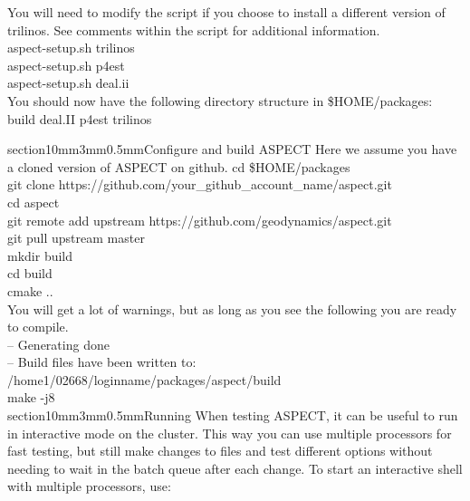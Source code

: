 \documentclass[11pt]{article}
\makeatletter
\renewcommand{\section}{\@startsection
  {section}{1}{0mm}{3mm}{0.5mm}{\bfseries\large}}
\makeatother
\begin{document}
You will need to modify the script if you choose to install a different version of trilinos.  See comments within the script for additional information.\\
 
 aspect-setup.sh trilinos \\
 aspect-setup.sh p4est \\
 aspect-setup.sh deal.ii    \\
 
 You should now have the following directory structure in \$HOME/packages: \\
  
  build  deal.II  p4est  trilinos

 \section{Configure and build ASPECT}
 Here we assume you have a cloned version of ASPECT on github.  
 cd \$HOME/packages \\
 git clone https://github.com/your\_github\_account\_name/aspect.git \\
 cd aspect \\
 git remote add upstream https://github.com/geodynamics/aspect.git \\
 git pull upstream master  \\
 mkdir build \\
 cd build \\
 cmake ..  \\

You will get a lot of warnings, but as long as you see the following you are ready to compile. \\
-- Generating done \\
-- Build files have been written to: /home1/02668/loginname/packages/aspect/build \\

make -j8 \\

\section{Running}
When testing ASPECT, it can be useful to run in interactive mode on the cluster. This way you can use multiple processors for fast testing, but still make changes to files and test different options without needing to wait in the batch queue after each change. To start an interactive shell with multiple processors, use: \\
\end{document}
